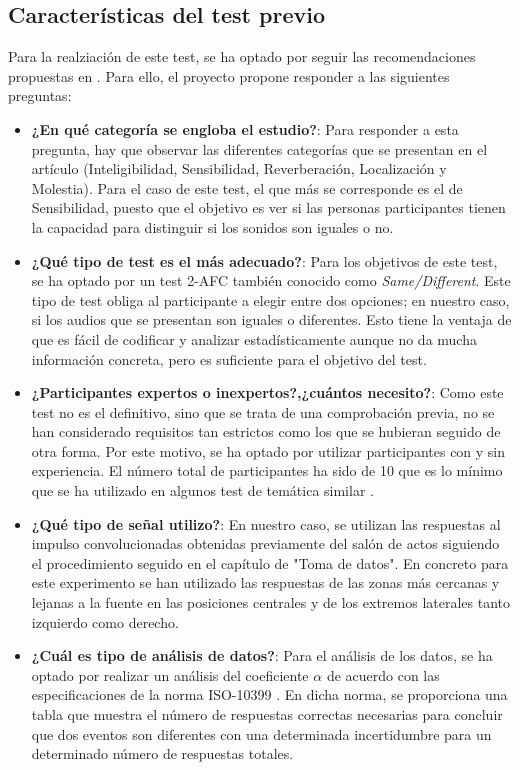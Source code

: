 \documentclass[11pt,a4paper,twoside]{book}
\begin{document}
            \subsection{Características del test previo}
                Para la realziación de este test, se ha optado por seguir las recomendaciones propuestas en \cite{Tejada2020}. Para ello, el proyecto propone responder a las siguientes preguntas:
                \begin{itemize}
                    \item \textbf{¿En qué categoría se engloba el estudio?}: Para responder a esta pregunta, hay que observar las diferentes categorías que se presentan en el artículo (Inteligibilidad, Sensibilidad, Reverberación, Localización y Molestia). Para el caso de este test, el que más se corresponde es el de Sensibilidad, puesto que el objetivo es ver si las personas participantes tienen la capacidad para distinguir si los sonidos son iguales o no.
                    \item \textbf{¿Qué tipo de test es el más adecuado?}: Para los objetivos de este test, se ha optado por un test 2-AFC también conocido como \textit{Same/Different}. Este tipo de test obliga al participante a elegir entre dos opciones; en nuestro caso, si los audios que se presentan son iguales o diferentes. Esto tiene la ventaja de que es fácil de codificar y analizar estadísticamente aunque no da mucha información concreta, pero es suficiente para el objetivo del test.
                    \item \textbf{¿Participantes expertos o inexpertos?,¿cuántos necesito?}: Como este test no es el definitivo, sino que se trata de una comprobación previa, no se han considerado requisitos tan estrictos como los que se hubieran seguido de otra forma. Por este motivo, se ha optado por utilizar participantes con y sin experiencia. El número total de participantes ha sido de 10 que es lo mínimo que se ha utilizado en algunos test de temática similar \cite{2019MNowak}.
                    \item \textbf{¿Qué tipo de señal utilizo?}: En nuestro caso, se utilizan las respuestas al impulso convolucionadas obtenidas previamente del salón de actos siguiendo el procedimiento seguido en el capítulo de "Toma de datos". En concreto para este experimento se han utilizado las respuestas de las zonas más cercanas y lejanas a la fuente en las posiciones centrales y de los extremos laterales tanto izquierdo como derecho.
                    \item \textbf{¿Cuál es tipo de análisis de datos?}: Para el análisis de los datos, se ha optado por realizar un análisis del coeficiente $\alpha$ de acuerdo con las especificaciones de la norma ISO-10399 \cite{ISO10399}. En dicha norma, se proporciona una tabla que muestra el número de respuestas correctas necesarias para concluir que dos eventos son diferentes con una determinada incertidumbre para un determinado número de respuestas totales.
                \end{itemize}
                
\end{document}
